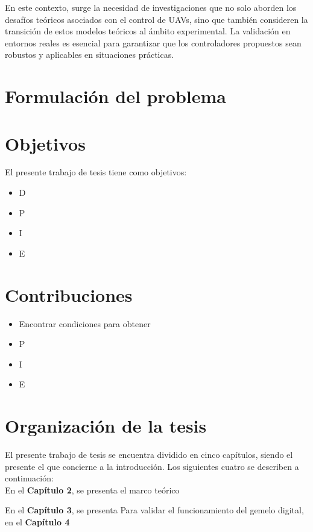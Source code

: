 En este contexto, surge la necesidad de investigaciones que no solo aborden los desafíos teóricos asociados con el control de UAVs, sino que también consideren la transición de estos modelos teóricos al ámbito experimental. La validación en entornos reales es esencial para garantizar que los controladores propuestos sean robustos y aplicables en situaciones prácticas.
\section{Formulación del problema}

\section{Objetivos}
El presente trabajo de tesis tiene como objetivos:
\begin{itemize}
  \item D
  \item P
  \item I
  \item E
\end{itemize}

\section{Contribuciones}
\begin{itemize}
    \item Encontrar condiciones para obtener 
    \item P
    \item I
    \item E
  \end{itemize}

\section{Organización de la tesis}
El presente trabajo de tesis se encuentra dividido en cinco capítulos,
siendo el presente el que concierne a la introducción. Los siguientes cuatro
 se describen a continuación:\\

En el \textbf{Capítulo 2}, se presenta el marco teórico 

En el \textbf{Capítulo 3}, se presenta 
Para validar el funcionamiento del gemelo digital, en el \textbf{Capítulo 4} 

